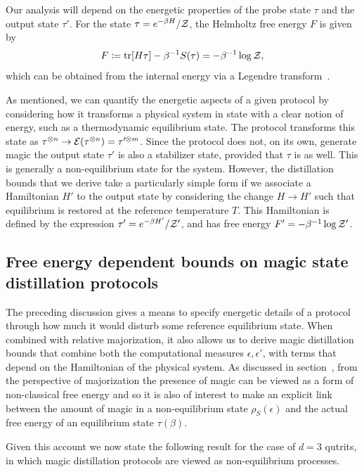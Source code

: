 \documentclass[pra,
aps,
twocolumn,
superscriptaddress,
groupedaddress,
nofootinbib,
reprint
]{revtex4-1}
\begin{document}
Our analysis will depend on the energetic properties of the probe state $\tau$ and the output state $\tau'$.
For the state $\tau = e^{-\beta H}/\mathcal{Z}$, the Helmholtz free energy $F$ is given by
\begin{equation}
	F \coloneqq \mbox{tr}[H \tau] - \beta^{-1}S(\tau) = -\beta^{-1}\log{\mathcal{Z}},
\end{equation}
which can be obtained from the internal energy via a Legendre transform~\cite{Pathria_1997}.

As mentioned, we can quantify the energetic aspects of a given protocol by considering how it transforms a physical system in state with a clear notion of energy, such as a thermodynamic equilibrium state. The protocol transforms this state as $\tau^{\otimes n} \rightarrow {\mathcal E}(\tau^{\otimes n}) = \tau^{\prime \otimes m}$.  Since the protocol does not, on its own, generate magic the output state $\tau'$ is also a stabilizer state, provided that $\tau$ is as well. This is generally a non-equilibrium state for the system. However, the distillation bounds that we derive take a particularly simple form if we associate a Hamiltonian $H'$ to the output state by considering the change $H \rightarrow H'$ such that equilibrium is restored at the reference temperature $T$. This Hamiltonian is defined by the expression $\tau' = e^{-\beta H'}/\mathcal{Z}'$, and has free energy $F' = -\beta^{-1} \log \mathcal{Z}'$.

\subsection{Free energy dependent bounds on magic state distillation protocols}
The preceding discussion gives a means to specify energetic details of a protocol through how much it would disturb some reference equilibrium state. When combined with relative majorization, it also allows us to derive magic distillation bounds that combine both the computational measures $\epsilon,\epsilon'$, with terms that depend on the Hamiltonian of the physical system. As discussed in section~, from the perspective of majorization the presence of magic can be viewed as a form of non-classical free energy and so it is also of interest to make an explicit link between the amount of magic in a non-equilibrium state $\rho_S(\epsilon)$ and the actual free energy of an equilibrium state $\tau(\beta)$. 

Given this account we now state the following result for the case of $d=3$ qutrits, in which magic distillation protocols are viewed as non-equilibrium processes.
\end{document}
